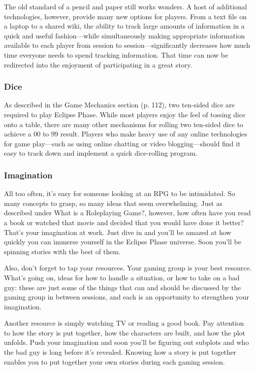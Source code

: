 The old standard of a pencil and paper still works wonders. A host of additional technologies, however, provide many new options for players. From a text file on a laptop to a shared wiki, the ability to track large amounts of information in a quick and useful fashion—while simultaneously making appropriate information available to each player from session to session—significantly decreases how much time everyone needs to spend tracking information. That time can now be redirected into the enjoyment of participating in a great story. 



\subsubsection{Dice} \label{sec:dice} 

As described in the Game Mechanics section (p. 112), two ten-sided dice are required to play Eclipse Phase. While most players enjoy the feel of tossing dice onto a table, there are many other mechanisms for rolling two ten-sided dice to achieve a 00 to 99 result. Players who make heavy use of any online technologies for game play—such as using online chatting or video blogging—should find it easy to track down and implement a quick dice-rolling program. 



\subsubsection{Imagination} \label{sec:imagination} 

All too often, it's easy for someone looking at an RPG to be intimidated. So many concepts to grasp, so many ideas that seem overwhelming. Just as described under What is a Roleplaying Game?, however, how often have you read a book or watched that movie and decided that you would have done it better? That's your imagination at work. Just dive in and you'll be amazed at how quickly you can immerse yourself in the Eclipse Phase universe. Soon you'll be spinning stories with the best of them. 

Also, don't forget to tap your resources. Your gaming group is your best resource. What's going on, ideas for how to handle a situation, or how to take on a bad guy: these are just some of the things that can and should be discussed by the gaming group in between sessions, and each is an opportunity to strengthen your imagination. 

Another resource is simply watching TV or reading a good book. Pay attention to how the story is put together, how the characters are built, and how the plot unfolds. Push your imagination and soon you'll be figuring out subplots and who the bad guy is long before it's revealed. Knowing how a story is put together enables you to put together your own stories during each gaming session. 

